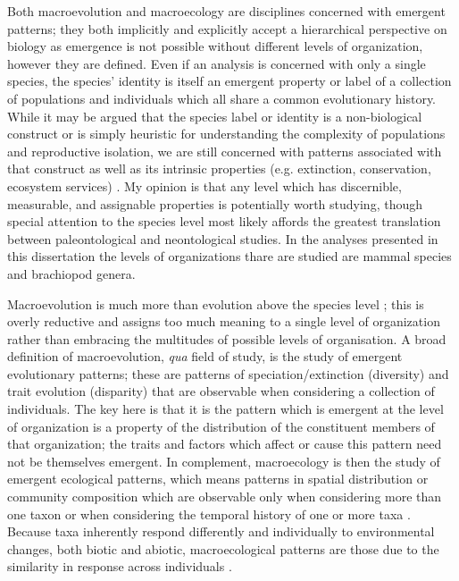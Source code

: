 Both macroevolution and macroecology are disciplines concerned with emergent patterns; they both implicitly and explicitly accept a hierarchical perspective on biology as emergence is not possible without different levels of organization, however they are defined. Even if an analysis is concerned with only a single species, the species' identity is itself an emergent property or label of a collection of populations and individuals which all share a common evolutionary history. While it may be argued that the species label or identity is a non-biological construct or is simply heuristic for understanding the complexity of populations and reproductive isolation, we are still concerned with patterns associated with that construct as well as its intrinsic properties (e.g. extinction, conservation, ecosystem services) \citep{Coyne2004,Jablonski2008a}. My opinion is that any level which has discernible, measurable, and assignable properties is potentially worth studying, though special attention to the species level most likely affords the greatest translation between paleontological and neontological studies. In the analyses presented in this dissertation the levels of organizations thare are studied are mammal species and brachiopod genera.

Macroevolution is much more than evolution above the species level \citep{Foote2007b}; this is overly reductive and assigns too much meaning to a single level of organization rather than embracing the multitudes of possible levels of organisation. A broad definition of macroevolution, \textit{qua} field of study, is the study of emergent evolutionary patterns; these are patterns of speciation/extinction (diversity) and trait evolution (disparity) that are observable when considering a collection of individuals. The key here is that it is the pattern which is emergent at the level of organization is a property of the distribution of the constituent members of that organization; the traits and factors which affect or cause this pattern need not be themselves emergent. In complement, macroecology is then the study of emergent ecological patterns, which means patterns in spatial distribution or community composition which are observable only when considering more than one taxon or when considering the temporal history of one or more taxa \citep{Brown1989,Brown1995,Smith2008b}. Because taxa inherently respond differently and individually to environmental changes, both biotic and abiotic, macroecological patterns are those due to the similarity in response across individuals \citep{Blois2009}.

